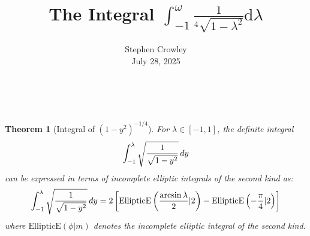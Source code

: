 \documentclass{article}
\newcommand{\mathd}{\mathrm{d}}
\newcommand{\tmaffiliation}[1]{\\ #1}
\newtheorem{theorem}{Theorem}
\begin{document}
\title{The Integral $\int_{- 1}^{\omega} \frac{1}{^4 \sqrt{1 - \lambda^2}}
\mathd \lambda$}

\author{
  Stephen Crowley
  \tmaffiliation{July 28, 2025}
}

\maketitle

\

\begin{theorem}
  [Integral of $(1 - y^2)^{- 1 / 4}$] For $\lambda \in [- 1, 1]$, the definite
  integral
  \begin{equation}
    \int_{- 1}^{\lambda} \sqrt{\frac{1}{\sqrt{1 - y^2}}}  \hspace{0.17em} dy
  \end{equation}
  can be expressed in terms of incomplete elliptic integrals of the second
  kind as:
  \begin{equation}
    \int_{- 1}^{\lambda} \sqrt{\frac{1}{\sqrt{1 - y^2}}}  \hspace{0.17em} dy =
    2 \left[ \mathrm{EllipticE} \left( \frac{\arcsin \lambda}{2} | 2 \right) -
    \mathrm{EllipticE} \left( - \frac{\pi}{4} | 2 \right) \right]
  \end{equation}
  where $\mathrm{EllipticE} (\phi |m)$ denotes the incomplete elliptic
  integral of the second kind.
\end{theorem}
\end{document}
